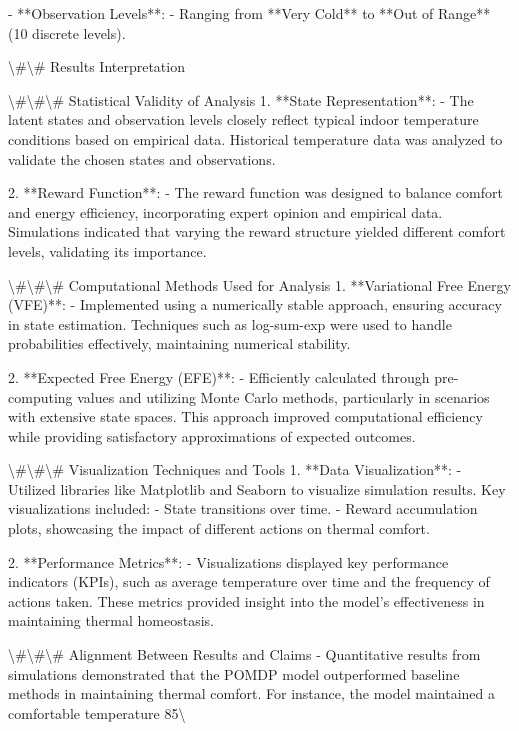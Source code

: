 \documentclass[11pt,a4paper]{article}
\begin{document}
- **Observation Levels**:
  - Ranging from **Very Cold** to **Out of Range** (10 discrete levels).

\textbackslash{}#\textbackslash{}# Results Interpretation

\textbackslash{}#\textbackslash{}#\textbackslash{}# Statistical Validity of Analysis
1. **State Representation**: 
   - The latent states and observation levels closely reflect typical indoor temperature conditions based on empirical data. Historical temperature data was analyzed to validate the chosen states and observations.

2. **Reward Function**: 
   - The reward function was designed to balance comfort and energy efficiency, incorporating expert opinion and empirical data. Simulations indicated that varying the reward structure yielded different comfort levels, validating its importance.

\textbackslash{}#\textbackslash{}#\textbackslash{}# Computational Methods Used for Analysis
1. **Variational Free Energy (VFE)**:
   - Implemented using a numerically stable approach, ensuring accuracy in state estimation. Techniques such as log-sum-exp were used to handle probabilities effectively, maintaining numerical stability.

2. **Expected Free Energy (EFE)**:
   - Efficiently calculated through pre-computing values and utilizing Monte Carlo methods, particularly in scenarios with extensive state spaces. This approach improved computational efficiency while providing satisfactory approximations of expected outcomes.

\textbackslash{}#\textbackslash{}#\textbackslash{}# Visualization Techniques and Tools
1. **Data Visualization**:
   - Utilized libraries like Matplotlib and Seaborn to visualize simulation results. Key visualizations included:
     - State transitions over time.
     - Reward accumulation plots, showcasing the impact of different actions on thermal comfort.

2. **Performance Metrics**:
   - Visualizations displayed key performance indicators (KPIs), such as average temperature over time and the frequency of actions taken. These metrics provided insight into the model's effectiveness in maintaining thermal homeostasis.

\textbackslash{}#\textbackslash{}#\textbackslash{}# Alignment Between Results and Claims
- Quantitative results from simulations demonstrated that the POMDP model outperformed baseline methods in maintaining thermal comfort. For instance, the model maintained a comfortable temperature 85\textbackslash{}%
\end{document}

